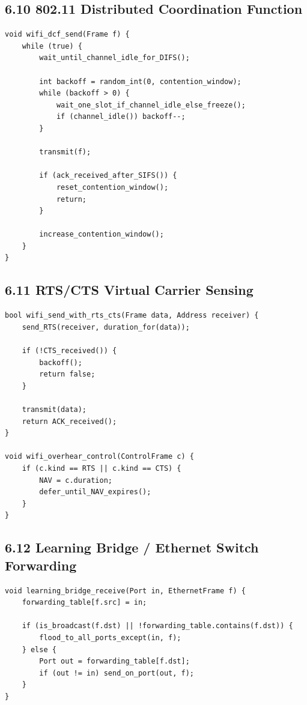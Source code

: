 \documentclass[11pt]{article}
\begin{document}
\subsection{6.10 802.11 Distributed Coordination
Function}\label{distributed-coordination-function}

\begin{verbatim}
void wifi_dcf_send(Frame f) {
    while (true) {
        wait_until_channel_idle_for_DIFS();

        int backoff = random_int(0, contention_window);
        while (backoff > 0) {
            wait_one_slot_if_channel_idle_else_freeze();
            if (channel_idle()) backoff--;
        }

        transmit(f);

        if (ack_received_after_SIFS()) {
            reset_contention_window();
            return;
        }

        increase_contention_window();
    }
}
\end{verbatim}

\subsection{6.11 RTS/CTS Virtual Carrier
Sensing}\label{rtscts-virtual-carrier-sensing}

\begin{verbatim}
bool wifi_send_with_rts_cts(Frame data, Address receiver) {
    send_RTS(receiver, duration_for(data));

    if (!CTS_received()) {
        backoff();
        return false;
    }

    transmit(data);
    return ACK_received();
}

void wifi_overhear_control(ControlFrame c) {
    if (c.kind == RTS || c.kind == CTS) {
        NAV = c.duration;
        defer_until_NAV_expires();
    }
}
\end{verbatim}

\subsection{6.12 Learning Bridge / Ethernet Switch
Forwarding}\label{learning-bridge-ethernet-switch-forwarding}

\begin{verbatim}
void learning_bridge_receive(Port in, EthernetFrame f) {
    forwarding_table[f.src] = in;

    if (is_broadcast(f.dst) || !forwarding_table.contains(f.dst)) {
        flood_to_all_ports_except(in, f);
    } else {
        Port out = forwarding_table[f.dst];
        if (out != in) send_on_port(out, f);
    }
}
\end{verbatim}
\end{document}
